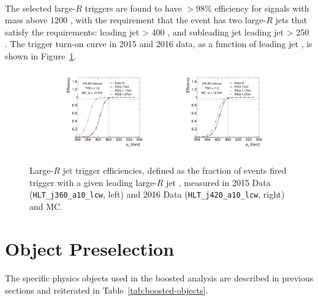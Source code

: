 \paragraph{}
The selected large-$R$ triggers are found to have $>98\%$ efficiency for signals with mass above 1200 \GeV, with the requirement that the event has two large-$R$ jets that satisfy the \pt requirements: leading jet \pt > 400 \GeV, and subleading jet leading jet \pt > 250 \GeV. The trigger turn-on curve in 2015 and 2016 data, as a function of leading jet \pt, is shown in Figure~\ref{fig:boosted-trigger-HLT-turnon}.
\begin{figure}[htbp!]
\begin{center}
  \includegraphics[width=0.45\textwidth,angle=-90]{figures/boosted/Trigger/trig_15_b77_pT_Efficiency.pdf}
  \includegraphics[width=0.45\textwidth,angle=-90]{figures/boosted/Trigger/trig_16_b77_pT_Efficiency.pdf}
  \caption{Large-$R$ jet trigger efficiencies, defined as the fraction of events fired trigger with a given leading large-$R$ jet \pt, measured in 2015 Data (\texttt{HLT\_j360\_a10\_lcw}, left) and 2016 Data (\texttt{HLT\_j420\_a10\_lcw}, right) and MC.}
  \label{fig:boosted-trigger-HLT-turnon}
\end{center}
\end{figure}

\section{Object Preselection}
\paragraph{}
The specific physics objects used in the boosted analysis are described in previous sections and reiterated in Table~\ref{tab:boosted-objects}.


